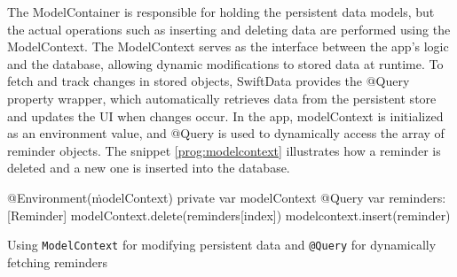 The ModelContainer is responsible for holding the persistent data models, but the actual operations such as inserting and deleting data are performed using the ModelContext. 
The ModelContext serves as the interface between the app's logic and the database, allowing dynamic modifications to stored data at runtime.
To fetch and track changes in stored objects, SwiftData provides the @Query property wrapper, which automatically retrieves data from the persistent store and updates the UI when changes occur. 
In the app, modelContext is initialized as an environment value, and @Query is used to dynamically access the array of reminder objects. 
The snippet \ref{prog:modelcontext} illustrates how a reminder is deleted and a new one is inserted into the database.

\begin{program}[htbp]
    \begin{SwiftCode}
    @Environment(\.modelContext) private var modelContext
    @Query var reminders: [Reminder]
    modelContext.delete(reminders[index])
    modelcontext.insert(reminder)\end{SwiftCode}
    \caption{Using \texttt{ModelContext} for modifying persistent data and \texttt{@Query} for dynamically fetching reminders}
    \label{prog:modelcontext}
\end{program}



        
